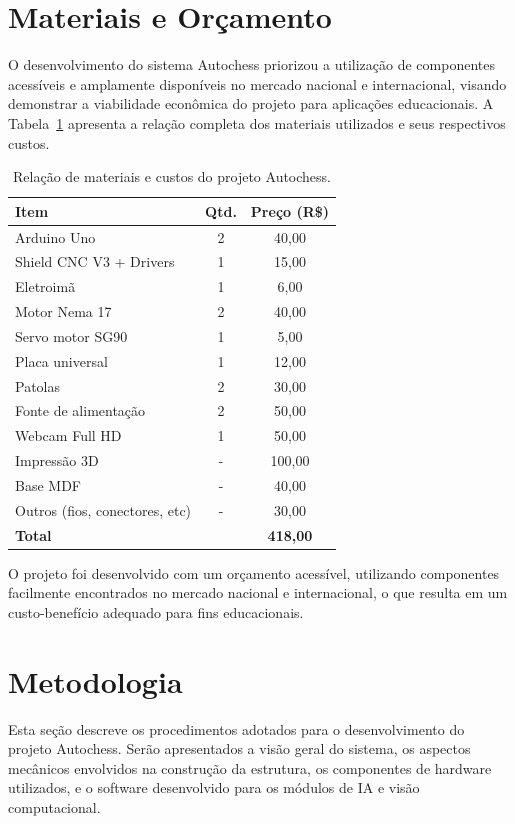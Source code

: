 \documentclass[a4paper]{ifacconf}
\begin{document}
\section{Materiais e Orçamento}

O desenvolvimento do sistema Autochess priorizou a utilização de componentes acessíveis e amplamente disponíveis no mercado nacional e internacional, visando demonstrar a viabilidade econômica do projeto para aplicações educacionais. A Tabela~\ref{tab:orcamento} apresenta a relação completa dos materiais utilizados e seus respectivos custos.

\begin{table}[H]
\centering
\begin{tabular}{|l|c|c|}
  \hline
  \textbf{Item} & \textbf{Qtd.} & \textbf{Preço (R\$)} \\
  \hline
  Arduino Uno & 2 & 40,00 \\
  Shield CNC V3 + Drivers & 1 & 15,00 \\
  Eletroimã & 1 & 6,00 \\
  Motor Nema 17 & 2 & 40,00 \\
  Servo motor SG90 & 1 & 5,00 \\
  Placa universal & 1 & 12,00 \\
  Patolas & 2 & 30,00 \\
  Fonte de alimentação & 2 & 50,00 \\
  Webcam Full HD & 1 & 50,00 \\
  Impressão 3D & - & 100,00 \\
  Base MDF & - & 40,00 \\
  Outros (fios, conectores, etc) & - & 30,00 \\
  \hline
  \textbf{Total} & & \textbf{418,00} \\
  \hline
\end{tabular}
\caption{Relação de materiais e custos do projeto Autochess.}
\label{tab:orcamento}
\end{table}

O projeto foi desenvolvido com um orçamento acessível, utilizando componentes facilmente encontrados no mercado nacional e internacional, o que resulta em um custo-benefício adequado para fins educacionais.

\section{Metodologia}
\par\noindent Esta seção descreve os procedimentos adotados para o desenvolvimento do projeto Autochess. Serão apresentados a visão geral do sistema, os aspectos mecânicos envolvidos na construção da estrutura, os componentes de hardware utilizados, e o software desenvolvido para os módulos de IA e visão computacional.
\end{document}
